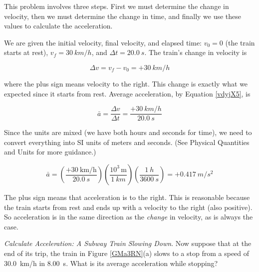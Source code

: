 \documentclass[../../main-ap-physics.tex]{subfiles}
\begin{document}
This problem involves three steps. First we must determine the change in velocity, then we must determine the change in time, and finally we use these values to calculate the acceleration.

\vspace{1em}

We are given the initial velocity, final velocity, and elapsed time: $v_0 = 0$ (the train starts at rest), $v_f = \SI{30}{km/h}$, and $\Delta t = \SI{20.0}{s}$. The train's change in velocity is

\begin{equation*}
    \Delta v = v_f - v_0 = +\SI{30}{km/h}
\end{equation*}

where the plus sign means velocity to the right. This change is exactly what we expected since it starts from rest. Average acceleration, by Equation \eqref{vdyjX5}, is

\begin{equation*}
    \bar{a} = \frac{\Delta v}{\Delta t} = \frac{+\SI{30}{km/h}}{\SI{20.0}{s}}
\end{equation*}

Since the units are mixed (we have both hours and seconds for time), we need to convert everything into SI units of meters and seconds. (See 
Physical Quantities and Units
for more guidance.) 

\begin{equation*}
    \bar{a} = \left(\frac{+\SI[per-mode=fraction]{30}{\kilo\meter\per\hour}}{\SI{20.0}{s}}\right)
        \left(\frac{10^3\,\text{m}}{\SI{1}{km}}\right)\left(\frac{\SI{1}{h}}{\SI{3600}{s}}\right) = +\SI{0.417}{m/s^2}
\end{equation*}

The plus sign means that acceleration is to the right. This is reasonable because the train starts from rest and ends up with a velocity to the right (also positive). So acceleration is in the same direction as the \textit{change} in velocity, as is always the case.

\endsolution

\begin{example} \label{dHBSwG}
    \textit{Calculate Acceleration: A Subway Train Slowing Down}. Now suppose that at the end of its trip, the train in Figure \ref{GMa3RN}(a) slows to a stop from a speed of \SI{30.0}{km/h} in \SI{8.00}{s}. What is its average acceleration while stopping?
\end{example}
\end{document}
